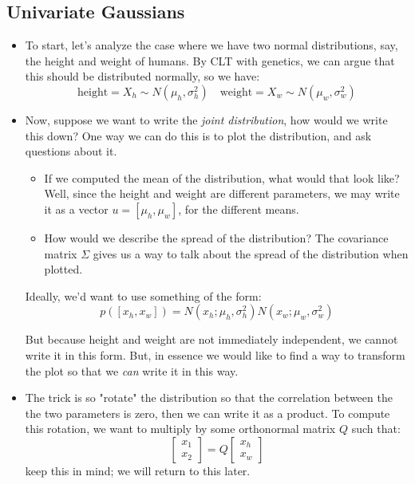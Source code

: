 \subsection{Univariate Gaussians}
\begin{itemize}
	\item To start, let's analyze the case where we have two normal distributions,
		say, the height and weight of humans. By CLT with genetics, we can argue that
		this should be distributed normally, so we have:
		\[
			\text{height} = X_h \sim N(\mu_h, \sigma_h^2) \quad \text{weight} = X_w
			\sim N(\mu_w, \sigma_w^2)
		\]
	\item Now, suppose we want to write the \textit{joint distribution}, how would we
		write this down? One way we can do this is to plot the distribution, and ask
		questions about it. 
		\begin{itemize}
			\item If we computed the mean of the distribution, what would that look
				like? Well, since the height and weight are different parameters, we
				may write it as a vector \( u = [\mu_h, \mu_w] \), for the different
				means. 
			\item How would we describe the spread of the distribution? The
				covariance matrix \( \Sigma \) gives us a way to talk about the
				spread of the distribution when plotted.   
		\end{itemize}
		Ideally, we'd want to use something of the form:
		\[
			p([x_h, x_w]) = N(x_h; \mu_h, \sigma_h^2) N(x_w; \mu_w, \sigma_w^2)
		\]

		But because height and weight are not immediately independent, we cannot
		write it in this form. But, in essence we would like to find a way to
		transform the plot so that we \textit{can} write it in this way.
	\item The trick is so "rotate" the distribution so that the correlation between
		the the two parameters is zero, then we can write it as a product. To compute
		this rotation, we want to multiply by some orthonormal matrix \( Q \) such
		that:
		\[
			\begin{bmatrix} x_1 \\ x_2 \end{bmatrix} = Q \begin{bmatrix} x_h \\ x_w \end{bmatrix}
		\]
		keep this in mind; we will return to this later. 
\end{itemize}

